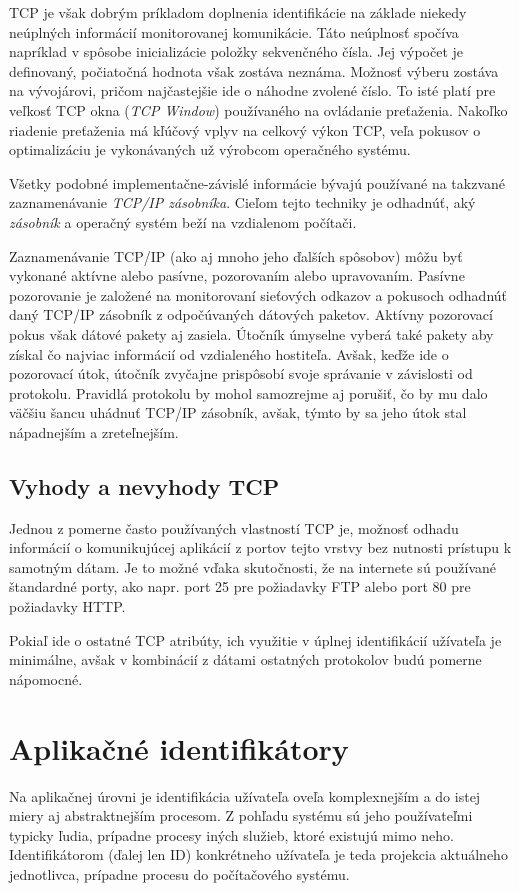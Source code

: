 \documentclass[
  digital, %
  table,   %
  lof,     %
  nolot,   %
  nocover
]{fithesis3}
\begin{document}
TCP je však dobrým príkladom doplnenia identifikácie na základe niekedy neúplných
informácií monitorovanej komunikácie. Táto neúplnosť spočíva napríklad v
spôsobe inicializácie položky sekvenčného čísla. Jej výpočet je definovaný,
počiatočná hodnota však zostáva neznáma. Možnosť výberu zostáva na vývojárovi,
pričom najčastejšie ide o náhodne zvolené číslo. To isté platí pre veľkosť TCP
okna (\textit{TCP Window}) používaného na ovládanie preťaženia. Nakoľko
riadenie preťaženia má kľúčový vplyv na celkový výkon TCP, veľa pokusov o
optimalizáciu je vykonávaných už výrobcom operačného systému.
 
Všetky podobné implementačne-závislé informácie bývajú používané na takzvané
zaznamenávanie \textit{TCP/IP zásobníka}. Cieľom tejto techniky je odhadnúť,
aký \textit{zásobník} a operačný systém beží na vzdialenom počítači.

Zaznamenávanie TCP/IP (ako aj mnoho jeho ďalších spôsobov) môžu byť vykonané
aktívne alebo pasívne, pozorovaním alebo upravovaním. Pasívne pozorovanie je
založené na monitorovaní sieťových odkazov a pokusoch odhadnúť daný TCP/IP
zásobník z odpočúvaných dátových paketov. Aktívny pozorovací pokus však dátové
pakety aj zasiela. Útočník úmyselne vyberá také pakety aby získal čo najviac
informácií od vzdialeného hostiteľa. Avšak, keďže ide o pozorovací útok,
útočník zvyčajne prispôsobí svoje správanie v závislosti od protokolu. Pravidlá
protokolu by mohol samozrejme aj porušiť, čo by mu dalo väčšiu šancu uhádnuť
TCP/IP zásobník, avšak, týmto by sa jeho útok stal nápadnejším a zreteľnejším.
 
\subsection{Vyhody a nevyhody TCP}
Jednou z pomerne často používaných vlastností TCP je, možnosť odhadu informácií
o komunikujúcej aplikácií z portov tejto vrstvy bez nutnosti prístupu k samotným
dátam. Je to možné vďaka skutočnosti, že na internete sú používané štandardné
porty, ako napr. port 25 pre požiadavky FTP alebo port 80 pre požiadavky HTTP.

Pokiaľ ide o ostatné TCP atribúty, ich využitie v úplnej identifikácií
užívateľa je minimálne, avšak v kombinácií z dátami ostatných protokolov budú
pomerne nápomocné.

\section{Aplikačné identifikátory}
Na aplikačnej úrovni je identifikácia užívateľa oveľa komplexnejším a do istej
miery aj abstraktnejším procesom. Z pohľadu systému sú jeho používateľmi
typicky ľudia, prípadne procesy iných služieb, ktoré existujú mimo neho.
Identifikátorom (ďalej len ID) konkrétneho užívateľa je teda projekcia aktuálneho
jednotlivca, prípadne procesu do počítačového systému.
\end{document}
